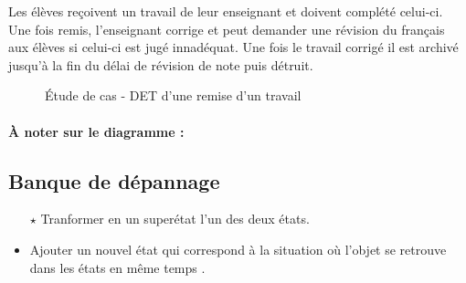 Les élèves reçoivent un travail de leur enseignant et doivent complété celui-ci. Une fois remis, l'enseignant corrige et peut demander une révision du français aux élèves si celui-ci est jugé innadéquat. Une fois le travail corrigé il est archivé jusqu'à la fin du délai de révision de note puis détruit.

\begin{figure}
	\caption{Étude de cas - DET d'une remise d'un travail}
	\centering
\end{figure}

\paragraph{À noter sur le diagramme : } 

\subsection{Banque de dépannage}


\begin{itemize}
	\item[$\mathbf{\star}$] Tranformer en un superétat l'un des deux états.
	\item Ajouter un nouvel état qui correspond à la situation où l'objet se retrouve dans les états en même temps .
\end{itemize}



